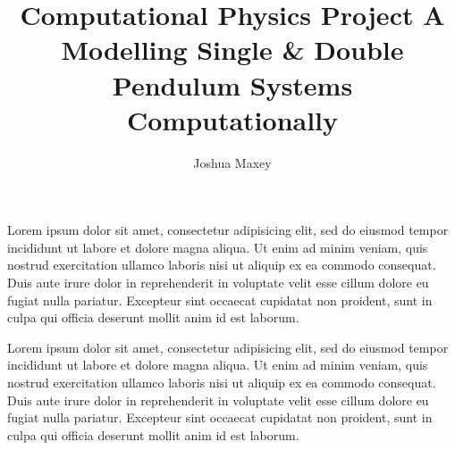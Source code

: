 \documentclass[11pt]{article}
\title{Computational Physics Project A \\ Modelling Single \& Double Pendulum Systems Computationally}
\author{Joshua Maxey}
\begin{document}
\maketitle

\begin{center}
Lorem ipsum dolor sit amet, consectetur adipisicing elit, sed do eiusmod
tempor incididunt ut labore et dolore magna aliqua. Ut enim ad minim veniam,
quis nostrud exercitation ullamco laboris nisi ut aliquip ex ea commodo
consequat. Duis aute irure dolor in reprehenderit in voluptate velit esse
cillum dolore eu fugiat nulla pariatur. Excepteur sint occaecat cupidatat non
proident, sunt in culpa qui officia deserunt mollit anim id est laborum.
\end{center}

\begin{multicols}{2}
Lorem ipsum dolor sit amet, consectetur adipisicing elit, sed do eiusmod
tempor incididunt ut labore et dolore magna aliqua. Ut enim ad minim veniam,
quis nostrud exercitation ullamco laboris nisi ut aliquip ex ea commodo
consequat. Duis aute irure dolor in reprehenderit in voluptate velit esse
cillum dolore eu fugiat nulla pariatur. Excepteur sint occaecat cupidatat non
proident, sunt in culpa qui officia deserunt mollit anim id est laborum.

\end{multicols}
\end{document}
